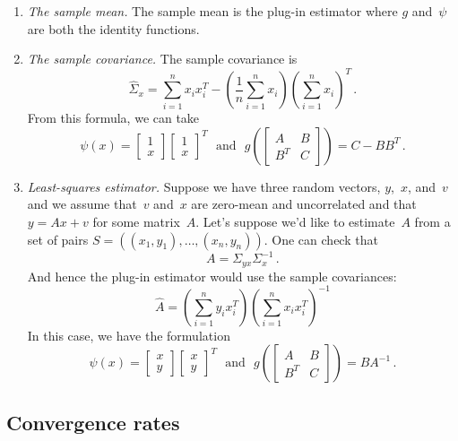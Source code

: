\documentclass{tufte-book}
\begin{document}
\begin{enumerate}
\def\labelenumi{\arabic{enumi}.}
\item
  \emph{The sample mean.} The sample mean is the plug-in estimator where
  \(g\) and~\(\psi\) are both the identity functions.
\item
  \emph{The sample covariance.} The sample covariance is \[
   \hat{\Sigma}_x = \sum_{i=1}^n x_i x_i^T -\left(\frac{1}{n}\sum_{i=1}^n x_i \right)\left(\sum_{i=1}^n x_i \right)^T\,.
  \] From this formula, we can take \[
   \psi(x) = \begin{bmatrix} 1\\ x \end{bmatrix}\begin{bmatrix} 1\\ x \end{bmatrix}^T ~~~\text{and}~~~
   g\left(\begin{bmatrix} A & B \\ B^T & C\end{bmatrix} \right) = C-BB^T\,.
  \]
\item
  \emph{Least-squares estimator.} Suppose we have three random vectors,
  \(y\),~\(x\), and~\(v\) and we assume that~\(v\) and~\(x\) are
  zero-mean and uncorrelated and that~\(y=Ax+v\) for some matrix~\(A\).
  Let's suppose we'd like to estimate~\(A\) from a set of pairs
  \(S=( (x_1,y_1), \ldots, (x_n, y_n))\). One can check that \[
   A = \Sigma_{yx} \Sigma_{x}^{-1}\,.
  \] And hence the plug-in estimator would use the sample covariances:
  \[
   \hat{A} = \left( \sum_{i=1}^n y_i x_i^T\right) \left( \sum_{i=1}^n x_i x_i^T\right)^{-1}
  \] In this case, we have the formulation \[
   \psi(x) = \begin{bmatrix} x\\ y \end{bmatrix}\begin{bmatrix} x\\ y \end{bmatrix}^T ~~~\text{and}~~~
   g\left(\begin{bmatrix} A & B \\ B^T & C\end{bmatrix} \right) = B A^{-1}\,.
  \]
\end{enumerate}

\hypertarget{convergence-rates}{%
\subsection{Convergence rates}\label{convergence-rates}}
\end{document}

